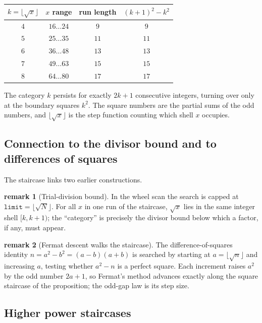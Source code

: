 \documentclass[11pt]{article}
\theoremstyle{definition}
\newtheorem{remark}{remark}
\begin{document}
\begin{center}
\begin{tabular}{c c c c}
\hline
$k=\lfloor\sqrt x\rfloor$ & $x$ range & run length & $(k+1)^2-k^2$\\
\hline
$4$ & $16\ldots24$ & $9$  & $9$\\
$5$ & $25\ldots35$ & $11$ & $11$\\
$6$ & $36\ldots48$ & $13$ & $13$\\
$7$ & $49\ldots63$ & $15$ & $15$\\
$8$ & $64\ldots80$ & $17$ & $17$\\
\hline
\end{tabular}
\end{center}

\noindent The category $k$ persists for exactly $2k+1$ consecutive integers,
turning over only at the boundary squares $k^{2}$. The square numbers are the
partial sums of the odd numbers, and $\lfloor\sqrt x\rfloor$ is the step
function counting which shell $x$ occupies.

\subsection{Connection to the divisor bound and to differences of squares}

The staircase links two earlier constructions.

\begin{remark}[Trial-division bound]
In the wheel scan the search is capped at $\texttt{limit}=\lfloor\sqrt N\rfloor$.
For all $x$ in one run of the staircase, $\sqrt x$ lies in the same integer shell
$[k,k+1)$; the ``category'' is precisely the divisor bound below which a factor,
if any, must appear.
\end{remark}

\begin{remark}[Fermat descent walks the staircase]
The difference-of-squares identity $n=a^{2}-b^{2}=(a-b)(a+b)$ is searched by
starting at $a=\lfloor\sqrt n\rfloor$ and increasing $a$, testing whether
$a^{2}-n$ is a perfect square. Each increment raises $a^{2}$ by the odd number
$2a+1$, so Fermat's method advances exactly along the square staircase of the
proposition; the odd-gap law is its step size.
\end{remark}

\subsection{Higher power staircases}
\end{document}
